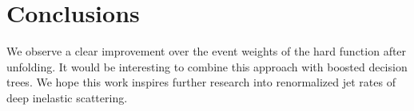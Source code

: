 \section{Conclusions}\label{sec:conclusions}

We observe a clear improvement over the event weights of the hard
function after unfolding. It would be interesting to combine this
approach with boosted decision trees. We hope this work inspires further
research into renormalized jet rates of deep inelastic scattering.

